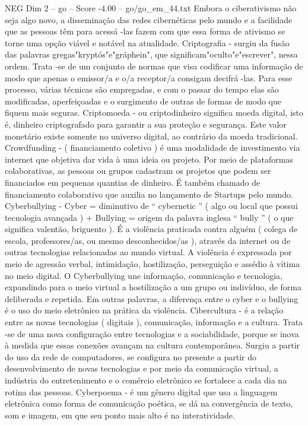 \begin{textsample}{NEG Dim 2 – go – Score -4.00 – go/go\_em\_44.txt}
Embora o ciberativismo não seja algo novo, a disseminação das redes cibernéticas pelo mundo e a facilidade que as pessoas têm para acessá -las fazem com que essa forma de ativismo se torne uma opção viável e notável na atualidade.
Criptografia - surgiu da fusão das palavras gregas"kryptós"e"gráphein", que significam"oculto"e"escrever", nessa ordem.
Trata -se de um conjunto de normas que visa codificar uma informação de modo que apenas o emissor/a e o/a receptor/a consigam decifrá -las.
Para esse processo, várias técnicas são empregadas, e com o passar do tempo elas são modificadas, aperfeiçoadas e o surgimento de outras de formas de modo que fiquem mais seguras.
Criptomoeda - ou criptodinheiro significa moeda digital, isto é, dinheiro criptografado para garantir a sua proteção e segurança.
Este valor monetário existe somente no universo digital, ao contrário da moeda tradicional.
Crowdfunding - ( financiamento coletivo ) é uma modalidade de investimento via internet que objetiva dar vida à uma ideia ou projeto.
Por meio de plataformas colaborativas, as pessoas ou grupos cadastram os projetos que podem ser financiados em pequenas quantias de dinheiro.
É também chamado de financiamento colaborativo que auxilia no lançamento de Startups pelo mundo.
Cyberbullying - Cyber = diminutivo de “ cybernetic ” ( algo ou local que possui tecnologia avançada ) + Bullying = origem da palavra inglesa “ bully ” ( o que significa valentão, briguento ).
É a violência praticada contra alguém ( colega de escola, professores/as, ou mesmo desconhecidos/as ), através da internet ou de outras tecnologias relacionadas ao mundo virtual.
A violência é expressada por meio de agressão verbal, intimidação, hostilização, perseguição e assédio à vítima no meio digital.
O Cyberbullying une informação, comunicação e tecnologia, expandindo para o meio virtual a hostilização a um grupo ou indivíduo, de forma deliberada e repetida.
Em outras palavras, a diferença entre o cyber e o bullying é o uso do meio eletrônico na prática da violência.
Cibercultura - é a relação entre as novas tecnologias ( digitais ), comunicação, informação e a cultura.
Trata -se de uma nova configuração entre tecnologias e a sociabilidade, porque se inova à medida que essas conexões avançam na cultura contemporânea.
Surgiu a partir do uso da rede de computadores, se configura no presente a partir do desenvolvimento de novas tecnologias e por meio da comunicação virtual, a indústria do entretenimento e o comércio eletrônico se fortalece a cada dia na rotina das pessoas.
Cyberpoema - é um gênero digital que usa a linguagem eletrônica como forma de comunicação poética, se dá na convergência de texto, som e imagem, em que seu ponto mais alto é na interatividade.

\end{textsample}
